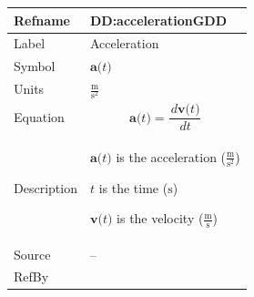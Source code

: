 \documentclass[12pt]{article}
\begin{document}
\vspace{\baselineskip}
\noindent
\begin{minipage}{\textwidth}
\begin{tabular}{>{\raggedright}p{}>{\raggedright\arraybackslash}p{}}
\toprule \textbf{Refname} & \textbf{DD:accelerationGDD}
\label{DD:accelerationGDD}
\\ \midrule
Label & Acceleration
        
\\ \midrule
Symbol & $\symbf{a}\text{(}t\text{)}$
         
\\ \midrule
Units & $\frac{\text{m}}{\text{s}^{2}}$
        
\\ \midrule
Equation & \begin{displaymath}
           \symbf{a}\text{(}t\text{)}=\frac{\,d\symbf{v}\text{(}t\text{)}}{\,dt}
           \end{displaymath}
\\ \midrule
Description & \begin{symbDescription}
              \item{$\symbf{a}\text{(}t\text{)}$ is the acceleration ($\frac{\text{m}}{\text{s}^{2}}$)}
              \item{$t$ is the time (${\text{s}}$)}
              \item{$\symbf{v}\text{(}t\text{)}$ is the velocity ($\frac{\text{m}}{\text{s}}$)}
              \end{symbDescription}
\\ \midrule
Source & --
         
\\ \midrule
RefBy & 
\\ \bottomrule
\end{tabular}
\end{minipage}
\end{document}
